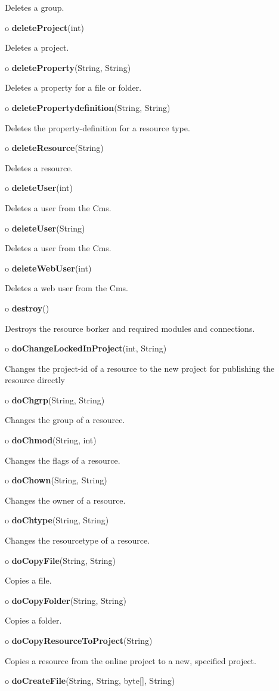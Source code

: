 \begin{description}
Deletes a group.
\item o {\bf deleteProject}(int)

Deletes a project.
\item o {\bf deleteProperty}(String, String)

Deletes a property for a file or folder.
\item o {\bf deletePropertydefinition}(String, String)

Deletes the property-definition for a resource type.
\item o {\bf deleteResource}(String)

Deletes a resource.
\item o {\bf deleteUser}(int)

Deletes a user from the Cms.
\item o {\bf deleteUser}(String)

Deletes a user from the Cms.
\item o {\bf deleteWebUser}(int)

Deletes a web user from the Cms.
\item o {\bf destroy}()

Destroys the resource borker and required modules and connections.
\item o {\bf doChangeLockedInProject}(int, String)

Changes the project-id of a resource to the new project for publishing the
resource directly
\item o {\bf doChgrp}(String, String)

Changes the group of a resource.
\item o {\bf doChmod}(String, int)

Changes the flags of a resource.
\item o {\bf doChown}(String, String)

Changes the owner of a resource.
\item o {\bf doChtype}(String, String)

Changes the resourcetype of a resource.
\item o {\bf doCopyFile}(String, String)

Copies a file.
\item o {\bf doCopyFolder}(String, String)

Copies a folder.
\item o {\bf doCopyResourceToProject}(String)

Copies a resource from the online project to a new, specified project.
\item o {\bf doCreateFile}(String, String, byte[], String)


\end{description}
